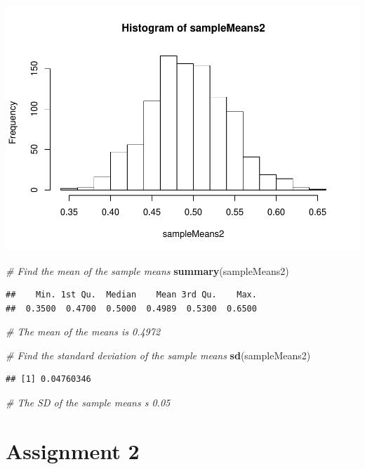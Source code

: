 \documentclass[]{article}
\newenvironment{Shaded}{\begin{snugshade}}{\end{snugshade}}
\newcommand{\KeywordTok}[1]{\textcolor[rgb]{0.13,0.29,0.53}{\textbf{#1}}}
\newcommand{\CommentTok}[1]{\textcolor[rgb]{0.56,0.35,0.01}{\textit{#1}}}
\newcommand{\NormalTok}[1]{#1}
\begin{document}
\includegraphics{macroNoGiodP_files/figure-latex/unnamed-chunk-2-2.pdf}

\begin{Shaded}
\begin{Highlighting}[]
\CommentTok{# Find the mean of the sample means }
\KeywordTok{summary}\NormalTok{(sampleMeans2)}
\end{Highlighting}
\end{Shaded}

\begin{verbatim}
##    Min. 1st Qu.  Median    Mean 3rd Qu.    Max. 
##  0.3500  0.4700  0.5000  0.4989  0.5300  0.6500
\end{verbatim}

\begin{Shaded}
\begin{Highlighting}[]
\CommentTok{# The mean of the means is 0.4972}

\CommentTok{# Find the standard deviation of the sample means }
\KeywordTok{sd}\NormalTok{(sampleMeans2)}
\end{Highlighting}
\end{Shaded}

\begin{verbatim}
## [1] 0.04760346
\end{verbatim}

\begin{Shaded}
\begin{Highlighting}[]
\CommentTok{# The SD of the sample means s 0.05}
\end{Highlighting}
\end{Shaded}

\section{Assignment 2}\label{assignment-2}
\end{document}
